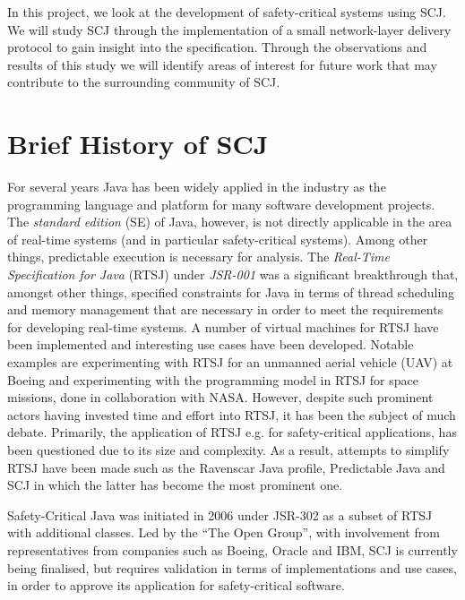 In this project, we look at the development of safety-critical systems using SCJ. We will study SCJ through the implementation of a small network-layer delivery protocol to gain insight into the specification. Through the observations and results of this study we will identify areas of interest for future work that may contribute to the surrounding community of SCJ.

\section{Brief History of SCJ} %
\label{sub:brief_history_of_java_for_safety_critical_systems}
For several years Java has been widely applied in the industry as the programming language and platform for many software development projects. The \textit{standard edition} (SE) of Java, however, is not directly applicable in the area of real-time systems (and in particular safety-critical systems). Among other things, predictable execution is necessary for analysis. The \textit{Real-Time Specification for Java} (RTSJ) under \textit{JSR-001}\cite{alan2001real, henties:2009-20} was a significant breakthrough that, amongst other things, specified constraints for Java in terms of thread scheduling and memory management that are necessary in order to meet the requirements for developing real-time systems. A number of virtual machines for RTSJ have been implemented and interesting use cases have been developed. Notable examples are experimenting with RTSJ for an unmanned aerial vehicle (UAV) at Boeing\cite{Armbruster:2007:RJV:1324969.1324974} and experimenting with the programming model in RTSJ for space missions, done in collaboration with NASA\cite{DBLP:conf/isorc/DvorakBCCCGIMMR04}. However, despite such prominent actors having invested time and effort into RTSJ, it has been the subject of much debate. Primarily, the application of RTSJ e.g. for safety-critical applications, has been questioned due to its size and complexity. As a result, attempts to simplify RTSJ have been made such as the Ravenscar Java profile\cite{Kwon:2002:RHI:583810.583825}, Predictable Java\cite{Bogholm:2009:PJP:1620405.1620427} and SCJ in which the latter has become the most prominent one.

Safety-Critical Java was initiated in 2006 under JSR-302 as a subset of RTSJ with additional classes\cite{Schoeberl:2012:SCJonJava}. Led by the ``The Open Group'', with involvement from representatives from companies such as Boeing, Oracle and IBM, SCJ is currently being finalised, but requires validation in terms of implementations and use cases, in order to approve its application for safety-critical software.

